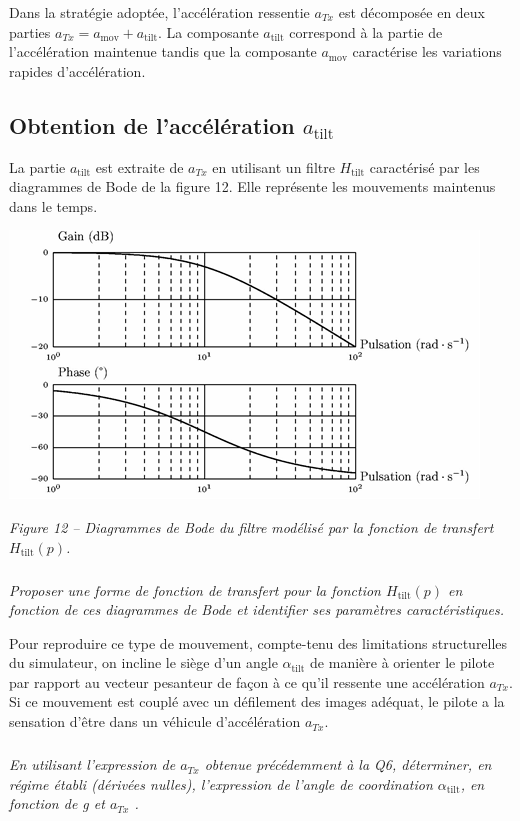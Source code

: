 \documentclass[10pt,fleqn]{article} %
\begin{document}
Dans la stratégie adoptée, l'accélération ressentie $a_{Tx}$ est décomposée en deux parties $a_{Tx} = a_{\text{mov}} + a_{\text{tilt}}$. La composante $a_{\text{tilt}}$ correspond à la partie de l'accélération maintenue tandis que la composante $a_{\text{mov}}$ caractérise les variations rapides d'accélération. 

\subsection{Obtention de l'accélération $a_{\text{tilt}}$}

La partie $a_{\text{tilt}}$ est extraite de $a_{Tx}$ en utilisant un filtre $H_{\text{tilt}}$ caractérisé par les diagrammes de Bode de la figure 12. Elle représente les mouvements maintenus dans le temps. 


\begin{center}
\includegraphics[width=.9\linewidth]{images/fig_12}

\textit{Figure 12 -- Diagrammes de Bode du filtre modélisé par la fonction de transfert $H_{\text{tilt}}(p)$.}
\end{center}

\subparagraph{}\textit{Proposer une forme de fonction de transfert pour la fonction $H_{\text{tilt}}(p)$ en fonction de ces diagrammes de Bode et identifier ses paramètres caractéristiques. }

Pour reproduire ce type de mouvement, compte-tenu des limitations structurelles du simulateur, on incline le siège d'un angle $\alpha_{\text{tilt}}$ de manière à orienter le pilote par rapport au vecteur pesanteur de façon à ce qu'il ressente une accélération $a_{Tx}$. Si ce mouvement est couplé avec un défilement des images adéquat, le pilote a la sensation d'être dans un véhicule d'accélération $a_{Tx}$.

\subparagraph{}\textit{En utilisant l'expression de $a_{Tx}$ obtenue précédemment à la Q6, déterminer, en régime établi (dérivées nulles), l'expression de l'angle de coordination $\alpha_{\text{tilt}}$, en fonction de g et $a_{Tx}$ . }
\end{document}

